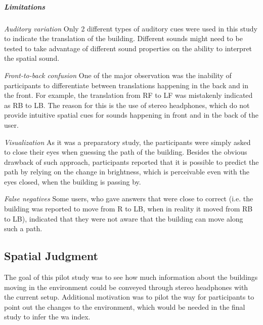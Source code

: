 \subparagraph{Limitations} 
\textit{Auditory variation} Only 2 different types of auditory cues were used in this study to indicate the translation of the building. Different sounds might need to be tested to take advantage of different sound properties on the ability to interpret the spatial sound. 

\textit{Front-to-back confusion} One of the major observation was the inability of participants to differentiate between translations happening in the back and in the front. For example, the translation from RF to LF was mistakenly indicated as RB to LB. The reason for this is the use of stereo headphones, which do not provide intuitive spatial cues for sounds happening in front and in the back of the user.

\textit{Visualization} As it was a preparatory study, the participants were simply asked to close their eyes when guessing the path of the building. Besides the obvious drawback of such approach, participants reported that it is possible to predict the path by relying on the change in brightness, which is perceivable even with the eyes closed, when the building is passing by.

\textit{False negatives} Some users, who gave answers that were close to correct (i.e. the building was reported to move from R to LB, when in reality it moved from RB to LB), indicated that they were not aware that the building can move along such a path. 












\subsection{Spatial Judgment}
\label{study_two}
The goal of this pilot study was to see how much information about the buildings moving in the environment could be conveyed through stereo headphones with the current setup. Additional motivation was to pilot the way for participants to point out the changes to the environment, which would be needed in the final study to infer the \gls{wa} index. 

